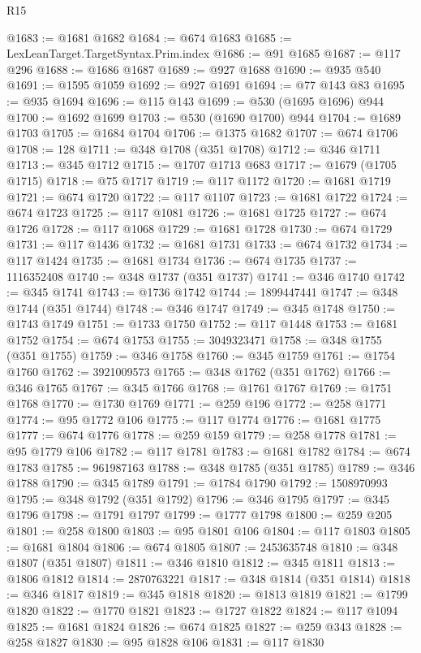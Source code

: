 \begin{lexlean}{R15}
\begin{coremodule}
{{{{{{{{{{{{{{{{{{{{{{{{{{{{{{{{{{{{{{{{{{{{{{{{{{{{{{{{{{{{{{{{{{{{{{@1683 := @1681 @1682
@1684 := @674 @1683
@1685 := LexLeanTarget.TargetSyntax.Prim.index
@1686 := @91 @1685
@1687 := @117 @296
@1688 := @1686 @1687
@1689 := @927 @1688
@1690 := @935 @540
@1691 := @1595 @1059
@1692 := @927 @1691
@1694 := @77 @143 @83
@1695 := @935 @1694
@1696 := @115 @143
@1699 := @530 (@1695 @1696) @944
@1700 := @1692 @1699
@1703 := @530 (@1690 @1700) @944
@1704 := @1689 @1703
@1705 := @1684 @1704
@1706 := @1375 @1682
@1707 := @674 @1706
@1708 := 128
@1711 := @348 @1708 (@351 @1708)
@1712 := @346 @1711
@1713 := @345 @1712
@1715 := @1707 @1713 @683
@1717 := @1679 (@1705 @1715)
@1718 := @75 @1717
@1719 := @117 @1172
@1720 := @1681 @1719
@1721 := @674 @1720
@1722 := @117 @1107
@1723 := @1681 @1722
@1724 := @674 @1723
@1725 := @117 @1081
@1726 := @1681 @1725
@1727 := @674 @1726
@1728 := @117 @1068
@1729 := @1681 @1728
@1730 := @674 @1729
@1731 := @117 @1436
@1732 := @1681 @1731
@1733 := @674 @1732
@1734 := @117 @1424
@1735 := @1681 @1734
@1736 := @674 @1735
@1737 := 1116352408
@1740 := @348 @1737 (@351 @1737)
@1741 := @346 @1740
@1742 := @345 @1741
@1743 := @1736 @1742
@1744 := 1899447441
@1747 := @348 @1744 (@351 @1744)
@1748 := @346 @1747
@1749 := @345 @1748
@1750 := @1743 @1749
@1751 := @1733 @1750
@1752 := @117 @1448
@1753 := @1681 @1752
@1754 := @674 @1753
@1755 := 3049323471
@1758 := @348 @1755 (@351 @1755)
@1759 := @346 @1758
@1760 := @345 @1759
@1761 := @1754 @1760
@1762 := 3921009573
@1765 := @348 @1762 (@351 @1762)
@1766 := @346 @1765
@1767 := @345 @1766
@1768 := @1761 @1767
@1769 := @1751 @1768
@1770 := @1730 @1769
@1771 := @259 @196
@1772 := @258 @1771
@1774 := @95 @1772 @106
@1775 := @117 @1774
@1776 := @1681 @1775
@1777 := @674 @1776
@1778 := @259 @159
@1779 := @258 @1778
@1781 := @95 @1779 @106
@1782 := @117 @1781
@1783 := @1681 @1782
@1784 := @674 @1783
@1785 := 961987163
@1788 := @348 @1785 (@351 @1785)
@1789 := @346 @1788
@1790 := @345 @1789
@1791 := @1784 @1790
@1792 := 1508970993
@1795 := @348 @1792 (@351 @1792)
@1796 := @346 @1795
@1797 := @345 @1796
@1798 := @1791 @1797
@1799 := @1777 @1798
@1800 := @259 @205
@1801 := @258 @1800
@1803 := @95 @1801 @106
@1804 := @117 @1803
@1805 := @1681 @1804
@1806 := @674 @1805
@1807 := 2453635748
@1810 := @348 @1807 (@351 @1807)
@1811 := @346 @1810
@1812 := @345 @1811
@1813 := @1806 @1812
@1814 := 2870763221
@1817 := @348 @1814 (@351 @1814)
@1818 := @346 @1817
@1819 := @345 @1818
@1820 := @1813 @1819
@1821 := @1799 @1820
@1822 := @1770 @1821
@1823 := @1727 @1822
@1824 := @117 @1094
@1825 := @1681 @1824
@1826 := @674 @1825
@1827 := @259 @343
@1828 := @258 @1827
@1830 := @95 @1828 @106
@1831 := @117 @1830
}}}}}}}}}}}}}}}}}}}}}}}}}}}}}}}}}}}}}}}}}}}}}}}}}}}}}}}}}}}}}}}}}}}}}}
\end{coremodule}
\end{lexlean}
